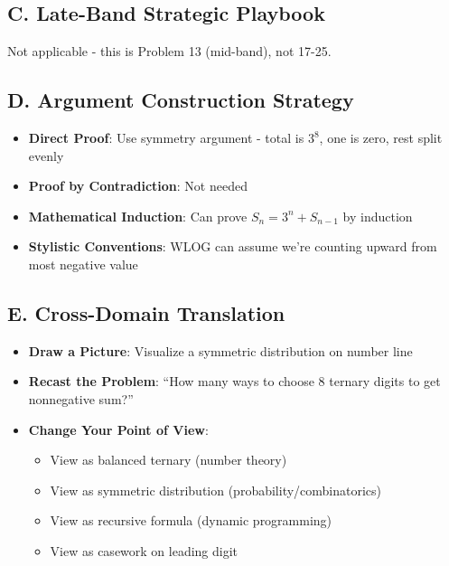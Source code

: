 \documentclass[12pt]{article}
\begin{document}
\begin{strategicbox}
\subsection*{C. Late-Band Strategic Playbook}
Not applicable - this is Problem 13 (mid-band), not 17-25.

\subsection*{D. Argument Construction Strategy}
\begin{itemize}[leftmargin=*]
    \item \textbf{Direct Proof}: Use symmetry argument - total is $3^8$, one is zero, rest split evenly
    \item \textbf{Proof by Contradiction}: Not needed
    \item \textbf{Mathematical Induction}: Can prove $S_n = 3^n + S_{n-1}$ by induction
    \item \textbf{Stylistic Conventions}: WLOG can assume we're counting upward from most negative value
\end{itemize}

\subsection*{E. Cross-Domain Translation}
\begin{itemize}[leftmargin=*]
    \item \textbf{Draw a Picture}: Visualize a symmetric distribution on number line
    \item \textbf{Recast the Problem}: ``How many ways to choose 8 ternary digits to get nonnegative sum?''
    \item \textbf{Change Your Point of View}: 
    \begin{itemize}
        \item View as balanced ternary (number theory)
        \item View as symmetric distribution (probability/combinatorics)
        \item View as recursive formula (dynamic programming)
        \item View as casework on leading digit
    \end{itemize}
\end{itemize}
\end{strategicbox}
\end{document}
